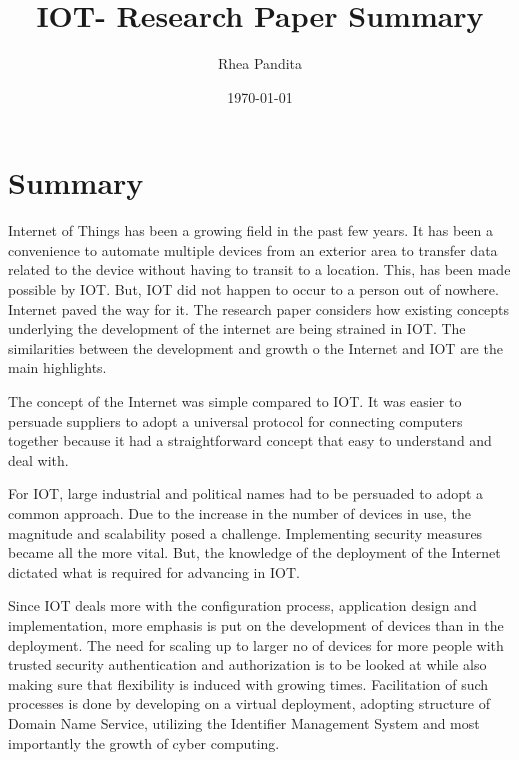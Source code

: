 \documentclass{report}
\title{IOT- Research Paper Summary}
\author{Rhea Pandita}
\date{\today}
\begin{document}
    
    
\setlength{\columnsep}{1.0cm}
    \large
    \section*{Summary}
    Internet of Things has been a growing field in the past few years. It has been a convenience to automate multiple devices from an exterior area to transfer data related to the device without having to transit to a location. This, has been made possible by IOT. But, IOT did not happen to occur to a person out of nowhere. Internet paved the way for it. The research paper considers how existing concepts underlying the development of the internet are being strained in IOT. The similarities between the development and growth o the Internet and IOT are the main highlights.

    
    The concept of the Internet was simple compared to IOT. It was easier to persuade suppliers to adopt a universal protocol for connecting computers together because it had a straightforward concept that easy to understand and deal with.

    
    For IOT, large industrial and political names had to be persuaded to adopt a common approach. Due to the increase in the number of devices in use, the magnitude and scalability posed a challenge. Implementing security measures became all the more vital. But, the knowledge of the deployment of the Internet dictated what is required for advancing in IOT.
    
    Since IOT deals more with the configuration process, application design and implementation, more emphasis is put on the development of devices than in the deployment. The need for scaling up to larger no of devices for more people with trusted security authentication and authorization is to be looked at while also making sure that flexibility is induced with growing times. Facilitation of such processes is done by developing on a virtual deployment, adopting structure of Domain Name Service, utilizing the Identifier Management System and most importantly the growth of cyber computing.
    
\end{document}
